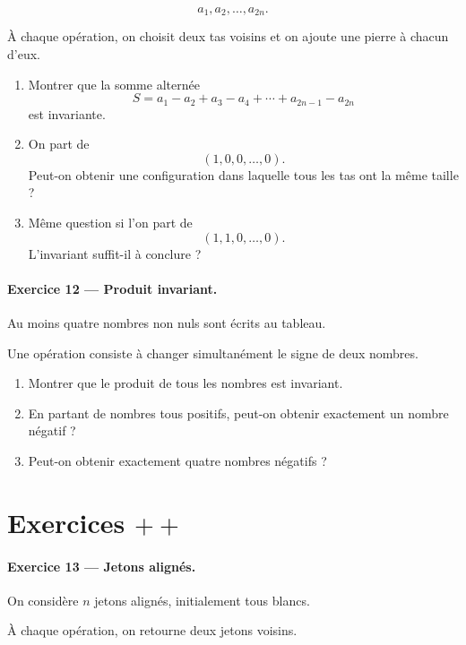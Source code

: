 \[
a_1,a_2,\dots,a_{2n}.
\]

À chaque opération, on choisit deux tas voisins et on ajoute une pierre à
chacun d'eux.

\begin{enumerate}
    \item Montrer que la somme alternée
    \[
    S=a_1-a_2+a_3-a_4+\cdots+a_{2n-1}-a_{2n}
    \]
    est invariante.

    \item On part de
    \[
    (1,0,0,\dots,0).
    \]
    Peut-on obtenir une configuration dans laquelle tous les tas ont la même
    taille ?

    \item Même question si l'on part de
    \[
    (1,1,0,\dots,0).
    \]
    L'invariant suffit-il à conclure ?
\end{enumerate}

\paragraph{Exercice 12 --- Produit invariant.}
Au moins quatre nombres non nuls sont écrits au tableau.

Une opération consiste à changer simultanément le signe de deux nombres.

\begin{enumerate}
    \item Montrer que le produit de tous les nombres est invariant.
    \item En partant de nombres tous positifs, peut-on obtenir exactement un
    nombre négatif ?
    \item Peut-on obtenir exactement quatre nombres négatifs ?
\end{enumerate}

\section{Exercices \(++\)}

\paragraph{Exercice 13 --- Jetons alignés.}
On considère \(n\) jetons alignés, initialement tous blancs.

À chaque opération, on retourne deux jetons voisins.

